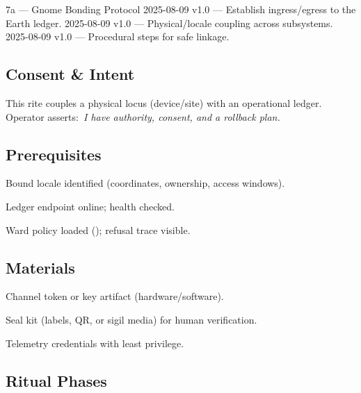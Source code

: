 \label{sec:cast7a-gnome}

\begin{SectionHeaderLedger}{7a — Gnome Bonding Protocol}
    2025-08-09 v1.0 — Establish ingress/egress to the Earth ledger.
    2025-08-09 v1.0 — Physical/locale coupling across subsystems.
     2025-08-09 v1.0 — Procedural steps for safe linkage.
\end{SectionHeaderLedger}

\subsection*{Consent \& Intent}
This rite couples a physical locus (device/site) with an operational ledger.
Operator asserts:\ \emph{I have authority, consent, and a rollback plan.}

\subsection*{Prerequisites}
\begin{tightitemize}
  \item Bound locale identified (coordinates, ownership, access windows).
  \item Ledger endpoint online; health checked.
  \item Ward policy loaded (); refusal trace visible.
\end{tightitemize}

\subsection*{Materials}
\begin{tightitemize}
  \item Channel token or key artifact (hardware/software).
  \item Seal kit (labels, QR, or sigil media) for human verification.
  \item Telemetry credentials with least privilege.
\end{tightitemize}

\subsection*{Ritual Phases}
